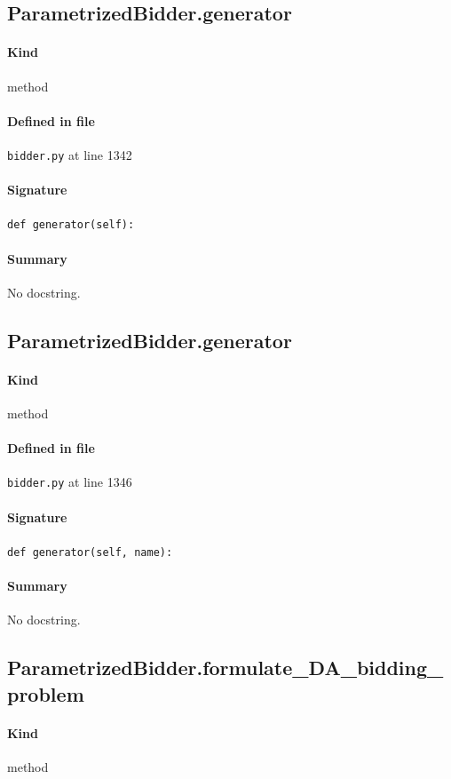 \documentclass[11pt]{report}
\begin{document}
\subsection{ParametrizedBidder.generator}
\label{def:bidder.py:ParametrizedBidder.generator:L1342}
\paragraph{Kind} method
\paragraph{Defined in file} \texttt{bidder.py} at line 1342
\paragraph{Signature} \texttt{def generator(self):}
\paragraph{Summary} No docstring.
\subsection{ParametrizedBidder.generator}
\label{def:bidder.py:ParametrizedBidder.generator:L1346}
\paragraph{Kind} method
\paragraph{Defined in file} \texttt{bidder.py} at line 1346
\paragraph{Signature} \texttt{def generator(self, name):}
\paragraph{Summary} No docstring.
\subsection{ParametrizedBidder.formulate\_DA\_bidding\_problem}
\label{def:bidder.py:ParametrizedBidder.formulate_DA_bidding_problem:L1349}
\paragraph{Kind} method
\end{document}
